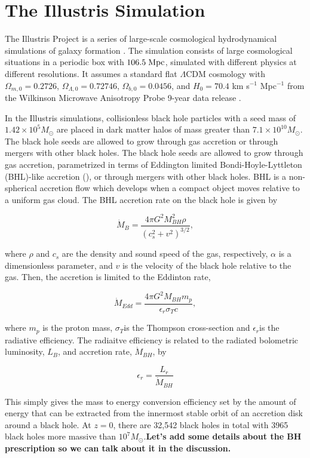 \section{The Illustris Simulation}

\label{sec:illustris}The Illustris Project is a series of large-scale
cosmological hydrodynamical simulations of galaxy formation \citep{vogelsberger2014properties}.
The simulation consists of large cosmological situations in a periodic
box with $106.5\;{\rm Mpc}$, simulated with different physics at
different resolutions. It assumes a standard flat $\Lambda$CDM cosmology
with $\Omega_{m,0}=0.2726$, $\Omega_{\Lambda,0}=0.72746$, $\Omega_{b,0}=0.0456$,
and $H_{0}=70.4$ km s$^{-1}$ Mpc$^{-1}$ from the Wilkinson Microwave
Anisotropy Probe 9-year data release \citep{hinshaw2013nineyear}.

In the Illustris simulations, collisionless black hole particles with
a seed mass of $1.42\times10^{5}M_{\odot}$ are placed in dark matter
halos of mass greater than $7.1\times10^{10}M_{\odot}$\citep{sijacki2014theillustris}.
The black hole seeds are allowed to grow through gas accretion or
through mergers with other black holes. The black hole seeds are allowed
to grow through gas accretion, parametrized in terms of Eddington
limited Bondi-Hoyle-Lyttleton (BHL)-like accretion (\citet{bondi1952accretion,bondihoyle1044}),
or through mergers with other black holes. BHL is a non-spherical
accretion flow which develops when a compact object moves relative
to a uniform gas cloud. The BHL accretion rate on the black hole is
given by

\begin{equation}
\dot{M}_{B}=\frac{4\pi G^{2}M_{BH}^{2}\rho}{(c_{s}^{2}+v^{2})^{3/2}},
\end{equation}


where $\rho$ and $c_{s}$ are the density and sound speed of the
gas, respectively, $\alpha$ is a dimensionless parameter, and $v$
is the velocity of the black hole relative to the gas. Then, the accretion
is limited to the Eddinton rate,

\begin{equation}
\dot{M}_{Edd}=\frac{4\pi G^{2}M_{BH}m_{p}}{\epsilon_{r}\sigma_{T}c},
\end{equation}


where $m_{p}$ is the proton mass, $\sigma_{T}$is the Thompson cross-section
and $\epsilon_{r}$is the radiative efficiency. The radiaitve efficiency
is related to the radiated bolometric luminosity, $L_{B}$, and accretion
rate, $\dot{M}_{BH}$, by
\begin{lyxcode}
\begin{equation}
\epsilon_{r}=\frac{L_{r}}{\dot{M}_{BH}}
\end{equation}

\end{lyxcode}
This simply gives the mass to energy conversion efficiency set by
the amount of energy that can be extracted from the innermost stable
orbit of an accretion disk around a black hole. At $z=0$, there are
32,542 black holes in total with 3965 black holes more massive than
$10^{7}M_{\odot}$.\textbf{Let's add some details about the BH prescription
so we can talk about it in the discussion.}
